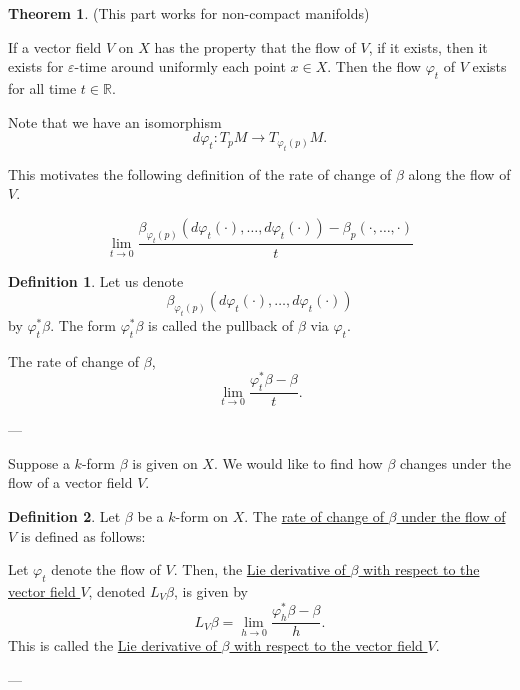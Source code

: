 \documentclass[11pt]{article}
\theoremstyle{definition}
\newtheorem{definition}{Definition}[section]
\newtheorem{theorem}{Theorem}[section]
\theoremstyle{remark}
\begin{document}
\begin{theorem}\label{thm:flow_existence_uniform}
(This part works for non-compact manifolds)

If a vector field $V$ on $X$ has the property that the flow of $V$, if it exists, then it exists for $\varepsilon$-time around uniformly each point $x \in X$. Then the flow $\varphi_t$ of $V$ exists for all time $t \in \mathbb{R}$.
\end{theorem}

Note that we have an isomorphism
\[ d\varphi_t \colon T_p M \to T_{\varphi_t(p)} M. \]

This motivates the following definition of the rate of change of $\beta$ along the flow of $V$.

\[
\lim_{t \to 0} \frac{\beta_{\varphi_t(p)} \left( d\varphi_t(\cdot), \dots, d\varphi_t(\cdot) \right) - \beta_p(\cdot, \dots, \cdot)}{t}
\]

\begin{definition}\label{def:pullback}
Let us denote
\[ \beta_{\varphi_t(p)} \left( d\varphi_t(\cdot), \dots, d\varphi_t(\cdot) \right) \]
by $\varphi_t^* \beta$. The form $\varphi_t^* \beta$ is called the pullback of $\beta$ via $\varphi_t$.
\end{definition}

The rate of change of $\beta$,
\[
\lim_{t \to 0} \frac{\varphi_t^* \beta - \beta}{t}.
\]

---

Suppose a $k$-form $\beta$ is given on $X$. We would like to find how $\beta$ changes under the flow of a vector field $V$.

\begin{definition}\label{def:lie_derivative_form}
Let $\beta$ be a $k$-form on $X$. The \underline{rate of change of $\beta$ under the flow of $V$} is defined as follows:

Let $\varphi_t$ denote the flow of $V$. Then, the \underline{Lie derivative of $\beta$ with respect to the vector field $V$}, denoted $L_V \beta$, is given by
\[
L_V \beta = \lim_{h \to 0} \frac{\varphi_h^* \beta - \beta}{h}.
\]
This is called the \underline{Lie derivative of $\beta$ with respect to the vector field $V$}.
\end{definition}

---
\end{document}
